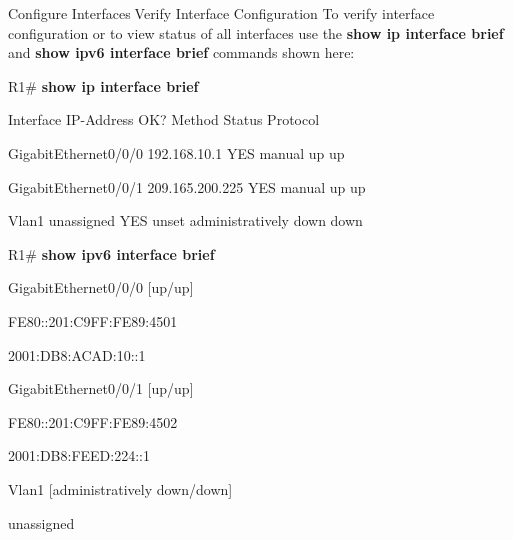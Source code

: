 \documentclass[
  ignorenonframetext,
]{beamer}
\begin{document}
\begin{frame}{Configure InterfacesVerify Interface Configuration}
\label{configure-interfaces-verify-interface-configuration}
{To verify interface configuration or to view status of all interfaces
use the } { \textbf{show ip interface brief } } {and } { \textbf{show
ipv6 interface brief } } {commands shown here:}

{R1\# } { \textbf{show ip interface brief} }

Interface IP-Address OK? Method Status Protocol

GigabitEthernet0/0/0 192.168.10.1 YES manual up up

GigabitEthernet0/0/1 209.165.200.225 YES manual up up

Vlan1 unassigned YES unset administratively down down

{R1\# } { \textbf{show ipv6 interface brief} }

GigabitEthernet0/0/0 {[}up/up{]}

FE80::201:C9FF:FE89:4501

2001:DB8:ACAD:10::1

GigabitEthernet0/0/1 {[}up/up{]}

FE80::201:C9FF:FE89:4502

2001:DB8:FEED:224::1

Vlan1 {[}administratively down/down{]}

unassigned

\end{frame}
\end{document}
